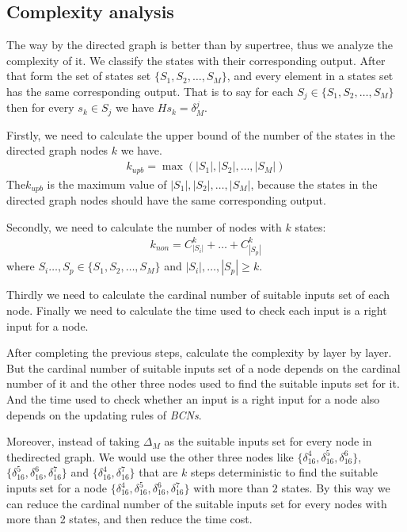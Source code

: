 \subsection{Complexity analysis}
The way by the directed graph is better than by supertree, thus we analyze the complexity of it. We classify the states with their corresponding output. After that form the set of states set $\{S_1, S_2,\ldots,S_M\}$,  and every element in a states set has the same corresponding output. That is to say for each $S_j\in\{S_1, S_2,\ldots,S_M\}$ then for every $s_k\in S_j$ we have $Hs_k=\delta_{M}^j$.

Firstly, we need to calculate the upper bound of the number of the states in the directed graph nodes $k$ we have.
\begin{equation}
\begin{split}
k_{upb}= \max(|S_1|,|S_2|,\ldots,|S_M|)
\end{split}
\end{equation}
The$ k_{upb}$ is the maximum value of $|S_1|,|S_2|,\ldots,|S_M|$, because the states in the directed graph nodes should have the same corresponding output.

Secondly, we need to calculate the number of nodes with $k$ states:
\begin{equation}
\begin{split}
k_{non}= C_{|S_i|}^k+\ldots +C_{|S_p|}^k
\end{split}
\end{equation}
where $S_i\ldots,S_p\in\{S_1, S_2,\ldots,S_M\}$ and $|S_i|,\ldots,|S_p|\ge k$.

Thirdly we need to calculate the cardinal number of suitable inputs set of each node. Finally we need to calculate the time used to check each input is a right input for a node.

After completing the previous steps, calculate the complexity by layer by layer. But the cardinal number of suitable inputs set of a node depends on the cardinal number of it and the other three nodes used to find the suitable inputs set for it. And the time used to check whether an input is a right input for a node also depends on the updating rules of {\em BCNs}.

Moreover, instead of taking $\Delta_M$ as the suitable inputs set for every node in thedirected graph. We would use the other three nodes like $\{\delta_{16}^4,\delta_{16}^5,\delta_{16}^6\}$, $\{\delta_{16}^5,\delta_{16}^6,\delta_{16}^7\}$ and $\{\delta_{16}^4,\delta_{16}^7\}$ that are $k$ steps deterministic to find the suitable inputs set for a node $\{\delta_{16}^4,\delta_{16}^5,\delta_{16}^6,\delta_{16}^7\}$ with more than $2$ states. By this way we can  reduce the cardinal number of the suitable inputs set for every nodes with more than 2 states, and then reduce the time cost. 

